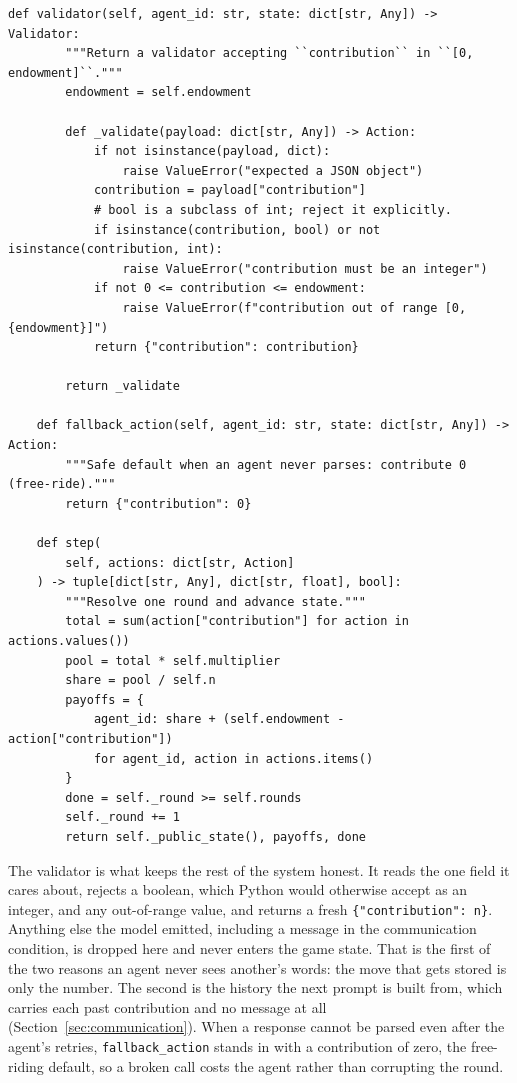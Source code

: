 \begin{lstlisting}[caption={The Public Goods decision cycle (\texttt{games/public\_goods.py}, the \texttt{step} docstring abridged): the validator accepts only an integer contribution in range and returns it alone; the fallback free-rides; \texttt{step} multiplies the pool, splits it, and pays each agent its share plus what it kept.}, label={lst:pgg}]
    def validator(self, agent_id: str, state: dict[str, Any]) -> Validator:
        """Return a validator accepting ``contribution`` in ``[0, endowment]``."""
        endowment = self.endowment

        def _validate(payload: dict[str, Any]) -> Action:
            if not isinstance(payload, dict):
                raise ValueError("expected a JSON object")
            contribution = payload["contribution"]
            # bool is a subclass of int; reject it explicitly.
            if isinstance(contribution, bool) or not isinstance(contribution, int):
                raise ValueError("contribution must be an integer")
            if not 0 <= contribution <= endowment:
                raise ValueError(f"contribution out of range [0, {endowment}]")
            return {"contribution": contribution}

        return _validate

    def fallback_action(self, agent_id: str, state: dict[str, Any]) -> Action:
        """Safe default when an agent never parses: contribute 0 (free-ride)."""
        return {"contribution": 0}

    def step(
        self, actions: dict[str, Action]
    ) -> tuple[dict[str, Any], dict[str, float], bool]:
        """Resolve one round and advance state."""
        total = sum(action["contribution"] for action in actions.values())
        pool = total * self.multiplier
        share = pool / self.n
        payoffs = {
            agent_id: share + (self.endowment - action["contribution"])
            for agent_id, action in actions.items()
        }
        done = self._round >= self.rounds
        self._round += 1
        return self._public_state(), payoffs, done
\end{lstlisting}

The validator is what keeps the rest of the system honest. It reads the one field it
cares about, rejects a boolean, which Python would otherwise accept as an integer, and
any out-of-range value, and returns a fresh \texttt{\{"contribution": n\}}. Anything
else the model emitted, including a message in the communication condition, is dropped
here and never enters the game state. That is the first of the two reasons an agent
never sees another's words: the move that gets stored is only the number. The second is
the history the next prompt is built from, which carries each past contribution and no
message at all (Section~\ref{sec:communication}). When a response cannot be parsed even
after the agent's retries, \texttt{fallback\_action} stands in with a contribution of
zero, the free-riding default, so a broken call costs the agent rather than corrupting
the round.

